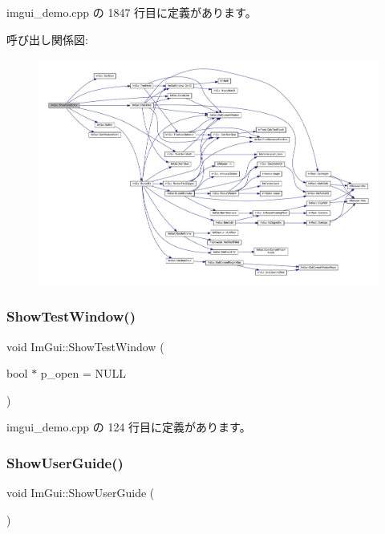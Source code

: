  imgui\+\_\+demo.\+cpp の 1847 行目に定義があります。

呼び出し関係図\+:\nopagebreak
\begin{figure}[H]
\begin{center}
\leavevmode
\includegraphics[width=350pt]{namespace_im_gui_ab2eb3dec78d054fe3feab1c091ec5de5_cgraph}
\end{center}
\end{figure}
\mbox{\label{namespace_im_gui_a52880ae1ecdd704a083558d31c9bfa50}} 
\subsubsection{\texorpdfstring{Show\+Test\+Window()}{ShowTestWindow()}}
{\footnotesize\ttfamily void Im\+Gui\+::\+Show\+Test\+Window (\begin{DoxyParamCaption}\item[{bool $\ast$}]{p\+\_\+open = {\ttfamily NULL} }\end{DoxyParamCaption})}



 imgui\+\_\+demo.\+cpp の 124 行目に定義があります。

\mbox{\label{namespace_im_gui_ad6f4919bc9aa806ca8d2c1d6e2bfb051}} 
\subsubsection{\texorpdfstring{Show\+User\+Guide()}{ShowUserGuide()}}
{\footnotesize\ttfamily void Im\+Gui\+::\+Show\+User\+Guide (\begin{DoxyParamCaption}{ }\end{DoxyParamCaption})}



